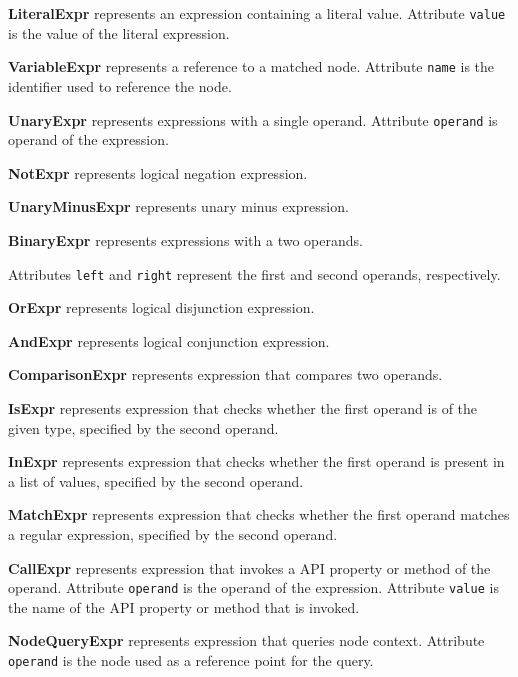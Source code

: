 \documentclass[parskip=full]{uvamscse}
\begin{document}
\begin{description}

\item\textbf{LiteralExpr} represents an expression containing a literal value. Attribute \texttt{value} is the value of the literal expression.

\item\textbf{VariableExpr} represents a reference to a matched node. Attribute \texttt{name} is the identifier used to reference the node.

\item\textbf{UnaryExpr} represents expressions with a single operand. Attribute \texttt{operand} is operand of the expression.

\item\textbf{NotExpr} represents logical negation expression.

\item\textbf{UnaryMinusExpr} represents unary minus expression.

\item\textbf{BinaryExpr} represents expressions with a two operands.

Attributes \texttt{left} and \texttt{right} represent the first and second operands, respectively.

\item\textbf{OrExpr} represents logical disjunction expression.

\item\textbf{AndExpr} represents logical conjunction expression.

\item\textbf{ComparisonExpr} represents expression that compares two operands.

\item\textbf{IsExpr} represents expression that checks whether the first operand is of the given type, specified by the second operand.

\item\textbf{InExpr} represents expression that checks whether the first operand is present in a list of values, specified by the second operand.

\item\textbf{MatchExpr} represents expression that checks whether the first operand matches a regular expression, specified by the second operand.

\item\textbf{CallExpr} represents expression that invokes a API property or method of the operand. Attribute \texttt{operand} is the operand of the expression. Attribute \texttt{value} is the name of the API property or method that is invoked.

\item\textbf{NodeQueryExpr} represents expression that queries node context. Attribute \texttt{operand} is the node used as a reference point for the query.

\end{description}
\end{document}
